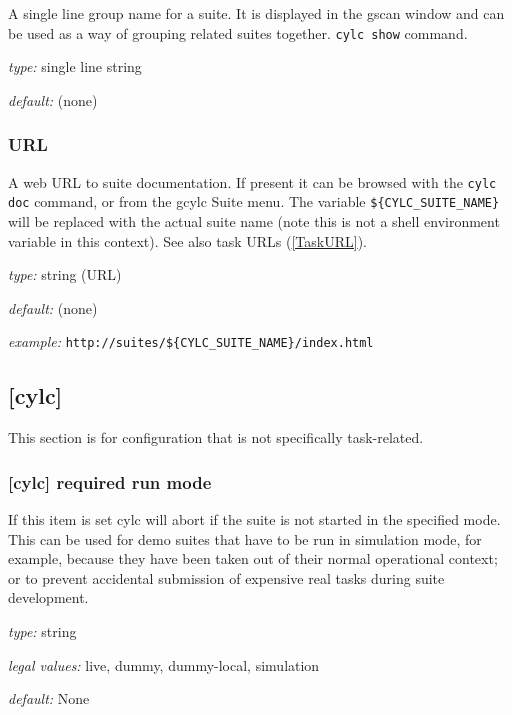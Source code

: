 A single line group name for a suite. It is displayed in the gscan
window and can be used as a way of grouping related suites together.
\lstinline=cylc show= command.

\begin{myitemize}
\item {\em type:} single line string
\item {\em default:} (none)
\end{myitemize}

\subsubsection{URL} \label{SuiteURL}

A web URL to suite documentation.  If present it can be browsed with the
\lstinline=cylc doc= command, or from the gcylc Suite menu.  The variable
\lstinline=${CYLC_SUITE_NAME}= will be replaced with the actual suite name
(note this is not a shell environment variable in this context). See also
task URLs (\ref{TaskURL}).

\begin{myitemize}
\item {\em type:} string (URL)
\item {\em default:} (none)
\item {\em example:} \lstinline=http://suites/${CYLC_SUITE_NAME}/index.html=
\end{myitemize}

\subsection{[cylc]}

This section is for configuration that is not specifically task-related.

\subsubsection[required run mode]{ [cylc] \textrightarrow required run mode}

If this item is set cylc will abort if the suite is not started in the
specified mode. This can be used for demo suites that have to be
run in simulation mode, for example, because they have been taken out of
their normal operational context; or to prevent accidental submission of
expensive real tasks during suite development.
\begin{myitemize}
    \item {\em type:} string
    \item {\em legal values:} live, dummy, dummy-local, simulation
    \item {\em default:} None
\end{myitemize}


